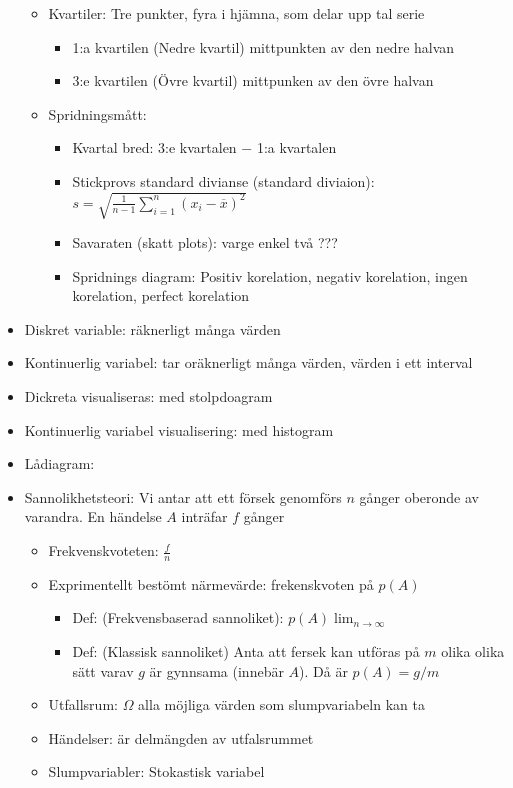\begin{itemize}
\begin{itemize}
\begin{itemize}
        \end{itemize}
        \item Kvartiler: Tre punkter, fyra i hjämna, som delar upp tal serie
        \begin{itemize}
          \item 1:a kvartilen (Nedre kvartil) mittpunkten av den nedre halvan
          \item 3:e kvartilen (Övre kvartil) mittpunken av den övre halvan
        \end{itemize}
        \item Spridningsmått:
        \begin{itemize}
            \item Kvartal bred: 3:e kvartalen $-$ 1:a kvartalen
            \item Stickprovs standard divianse (standard diviaion): $s=\sqrt{\frac{1}{n-1}\sum_{i=1}^{n}(x_i - \overline{x})^2}$
            \item Savaraten (skatt plots): varge enkel två ???
            \item Spridnings diagram: Positiv korelation, negativ korelation, ingen korelation, perfect korelation
        \end{itemize}
    \end{itemize}
    \item Diskret variable: räknerligt många värden
    \item Kontinuerlig variabel: tar oräknerligt många värden, värden i ett interval
    \item Dickreta visualiseras: med stolpdoagram
    \item Kontinuerlig variabel visualisering: med histogram
    \item Lådiagram:
    \item Sannolikhetsteori: Vi antar att ett försek genomförs $n$ gånger oberonde av varandra. En händelse $A$ inträfar $f$ gånger
    \begin{itemize}
      \item Frekvenskvoteten: $\frac{f}{n}$
      \item Exprimentellt bestömt närmevärde: frekenskvoten på $p(A)$
        \begin{itemize}
          \item Def: (Frekvensbaserad sannoliket): $p(A) \lim_{n\to\infty}$
            \item Def: (Klassisk sannoliket) Anta att fersek kan utföras på $m$ olika olika sätt varav $g$ är gynnsama (innebär $A$). Då är $p(A)=g/m$
        \end{itemize}
      \item Utfallsrum: $\Omega$ alla möjliga värden som slumpvariabeln kan ta
      \item Händelser: är delmängden av utfalsrummet
      \item Slumpvariabler: Stokastisk variabel
    \end{itemize}
\end{itemize}


